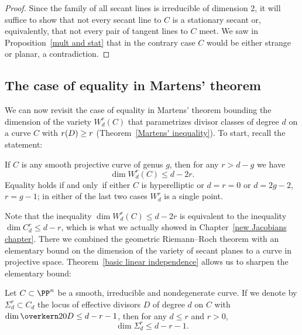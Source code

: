 \begin{proof}
Since the family of all secant lines is irreducible of dimension 2,  it
will suffice to show that not every secant line to $C$ is a
stationary secant
%
or, equivalently, that not every pair of tangent lines to $C$
meet. We saw in Proposition~\ref{mult and stat} that in the contrary
case
$C$ would be either strange or planar, a contradiction.
\end{proof}


\subsection*{The case of equality in Martens' theorem}

We can now revisit
the case
of equality in
%
Martens' theorem
bounding the dimension of the variety
$W^r_d(C)$
%
that parametrizes
divisor classes of degree $d$ on a curve $C$
with $r(D) \geq\nobreak r$
(Theorem~\ref{Martens' inequality}).
To start, recall the statement:

\begin{theorem}[Martens]\label{full Martens}
If $C$ is any smooth projective curve of genus $g$, then for any $r>d-g$
we have
$$
\dim W^r_d(C) \leq d-2r.
$$
Equality holds if and only~if either $C$ is
hyperelliptic
%
or $d=r=0$ or $d=2g-2$, $r=g-1$; in either of the last two cases $W^r_d$ is
a single point.
\unif
\end{theorem}

Note that the inequality $\dim W^r_d(C) \leq d-2r$ is equivalent to the
%
inequality $\dim
C^r_d
\leq d-r$, which is what we actually showed
in Chapter~\ref{new Jacobians chapter}. There we combined
the geometric Riemann--Roch theorem
%
with an elementary bound on the
dimension of the variety of secant planes to a curve in projective space.
Theorem~\ref{basic linear independence} allows us to sharpen the elementary bound:

\begin{lemma}\label{Strong secant plane lemma}
Let $C \subset \PP^n$ be a smooth, irreducible and nondegenerate curve. If
%
we denote by $
\Sigma^r_d
\subset C_d$ the locus of effective divisors
%
$D$ of degree $d$ on $C$ with $\dim \overkern20 D \leq d-r-1$, then for
any $d \leq r$ and $r > 0$,
$$
\dim \Sigma^r_d \leq d-r-1.
$$
\end{lemma}

